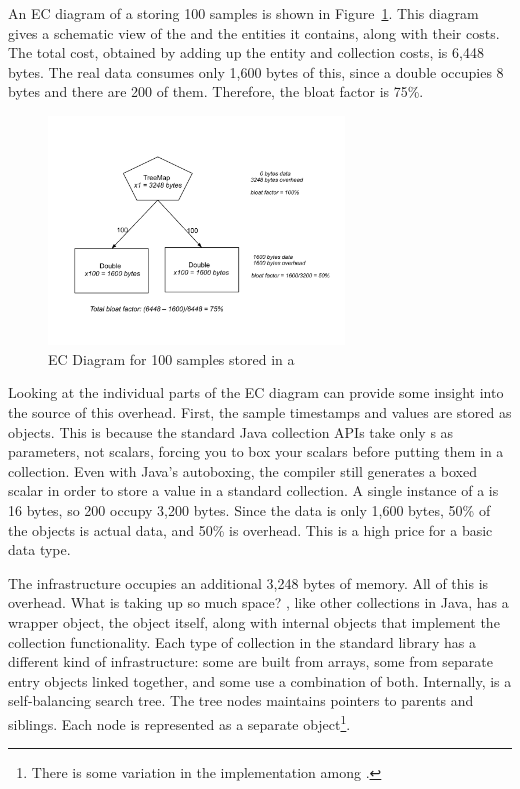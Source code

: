An EC diagram of a  storing 100 samples is shown in
Figure~\ref{fig:content-schematic-treemap-doubles}.  This diagram gives a
schematic view of the  and the entities it contains, along with
their costs. The total cost, obtained by adding up the entity and collection
costs, is 6,448 bytes. The real data consumes only 1,600 bytes of this, since a
double occupies 8 bytes and there are 200 of them. Therefore, the bloat factor
is 75\%.

\begin{figure}
  \centering
  \includegraphics[width=0.7\textwidth]{part1/Figures/memoryhealth/treemap-doubles}
  \caption{EC Diagram for 100 samples stored in a }
  \label{fig:content-schematic-treemap-doubles}
\end{figure} 
 
Looking at the individual parts of the EC diagram can provide some insight into
the source of this overhead. First, the sample timestamps and values are stored
as  objects. This is because the standard Java collection APIs take
only s as parameters, not scalars, forcing you to box your scalars
before putting them in a collection. Even with Java's autoboxing, the compiler
still generates a boxed scalar in order to store a value in a standard
collection.  A single instance of a  is 16 bytes, so 200
 occupy 3,200 bytes. Since the data is only 1,600 bytes,  50\% of
the  objects is actual data, and 50\% is overhead. This is a high
price for a basic data type.

The  infrastructure occupies an additional 3,248 bytes of
memory. All of this is overhead. What is taking up so much space? 
, like other collections in Java, has a wrapper object, the
 object itself, along with internal objects that implement
the collection functionality. Each type of collection in the standard library
has a different kind of infrastructure: some are built from arrays, some from
separate entry objects linked together, and some use a combination of both.
Internally,  is a self-balancing search tree. The tree nodes
maintains pointers to parents and siblings. Each node is represented as a
separate object\footnote{There is some variation in the implementation among
\jres.}.

